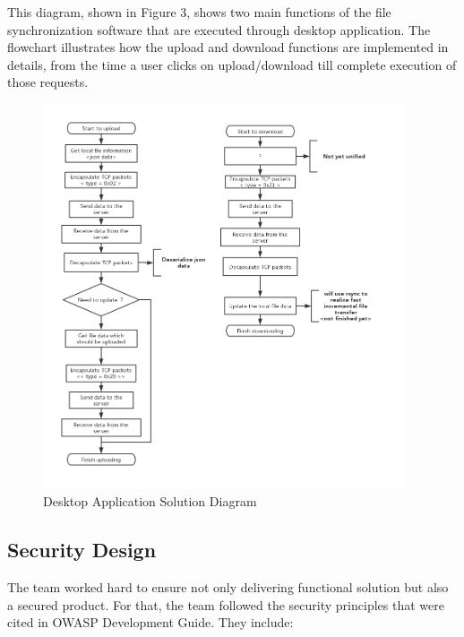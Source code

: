 \documentclass{article}
\begin{document}
\hfill \break
This diagram, shown in Figure 3, shows two main functions of the file synchronization software that are executed through desktop application.
The flowchart illustrates how the upload and download functions are implemented in details, from the time a user clicks on upload/download till complete execution of those requests.

\begin{figure}[H]
    \centering
    \includegraphics[width=0.95\textwidth]{flowchart}
    \caption{Desktop Application Solution Diagram}
    \label{fig:flowchart1}
\end{figure}

\hfill \break

\subsection{Security Design}

The team worked hard to ensure not only delivering functional solution but also a secured product. For that, the team followed the security principles that were cited in OWASP Development Guide. They include:
\end{document}
